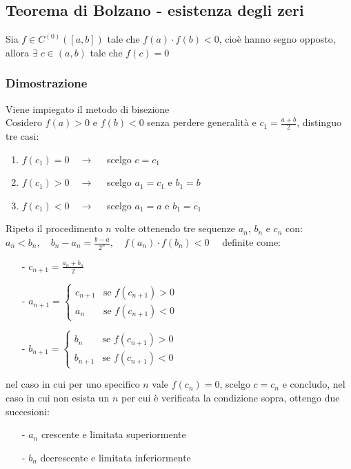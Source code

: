 \documentclass[a4paper]{article}
\newcommand\cont[2]{C^{(#1)} \left({#2}\right)}
\begin{document}
\subsection{Teorema di Bolzano - esistenza degli zeri}
Sia \(f \in \cont{0}{\left[a, b\right]}\) tale che \(f(a) \cdot f(b) < 0\), cioè hanno segno opposto, allora \(\exists \; c \in \left(a, b\right)\)
tale che \(f(c) = 0\)

\subsubsection*{Dimostrazione}
Viene impiegato il metodo di bisezione \\
Cosidero \(f(a) > 0\) e \(f(b) < 0\) senza perdere generalità e \(\displaystyle c_1 = \frac{a + b}{2}\), distinguo tre casi:
\begin{enumerate} [topsep=3pt, itemsep=0pt]
	\item \(f(c_1) = 0 \quad \rightarrow \quad\) scelgo \(c = c_1\)
	\item \(f(c_1) > 0 \quad \rightarrow \quad\) scelgo \(a_1 = c_1\) e \(b_1 = b\)
	\item \(f(c_1) < 0 \quad \rightarrow \quad\) scelgo \(a_1 = a\) e \(b_1 = c_1\)
\end{enumerate}
Ripeto il procedimento \(n\) volte ottenendo tre sequenze \(a_n\), \(b_n\) e \(c_n\) con: \\
\(\displaystyle a_n < b_n, \quad b_n - a_n = \frac{b-a}{2^n}, \quad f(a_n) \cdot f(b_n) < 0 \quad\) definite come:
\begin{itemize} [topsep=3pt, itemsep=0pt]
	\item[-] \(\displaystyle c_{n+1} = \frac{a_n + b_n}{2}\)
	\item[-] \(a_{n+1} = \begin{cases}
		c_{n+1} &\text{se } f(c_{n+1}) > 0 \\
		a_n & \text{se } f(c_{n+1}) < 0
	\end{cases}\)
	\item[-] \(b_{n+1} = \begin{cases}
		b_n &\text{se } f(c_{n+1}) > 0 \\
		b_{n+1} & \text{se } f(c_{n+1}) < 0
	\end{cases}\)
\end{itemize}
nel caso in cui per uno specifico \(n\) vale \(f(c_n) = 0\), scelgo \(c = c_n\) e concludo, nel caso in cui non esista un \(n\)
per cui è verificata la condizione sopra, ottengo due succesioni:
\begin{itemize} [topsep=3pt, itemsep=0pt]
	\item[-] \(a_n\) crescente e limitata superiormente
	\item[-] \(b_n\) decrescente e limitata inferiormente
\end{itemize}
\end{document}
